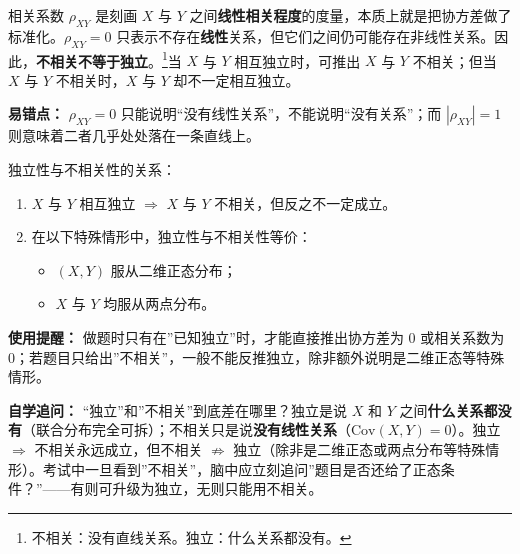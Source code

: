 ﻿\documentclass[lang=cn,11pt]{elegantbook}
\begin{document}
\begin{note}
相关系数 \(\rho_{XY}\) 是刻画 \(X\) 与 \(Y\) 之间\textbf{线性相关程度}的度量，本质上就是把协方差做了标准化。\(\rho_{XY} = 0\) 只表示不存在\textbf{线性}关系，但它们之间仍可能存在非线性关系。因此，\textbf{不相关不等于独立}。\footnote{不相关：没有直线关系。独立：什么关系都没有。}当 \(X\) 与 \(Y\) 相互独立时，可推出 \(X\) 与 \(Y\) 不相关；但当 \(X\) 与 \(Y\) 不相关时，\(X\) 与 \(Y\) 却不一定相互独立。

\textbf{易错点：} \(\rho_{XY}=0\) 只能说明“没有线性关系”，不能说明“没有关系”；而 \(|\rho_{XY}|=1\) 则意味着二者几乎处处落在一条直线上。
\end{note}

\begin{property}\label{prop:independence-uncorrelated}
独立性与不相关性的关系：
\begin{enumerate}
    \item \(X\) 与 \(Y\) 相互独立 \(\Rightarrow\) \(X\) 与 \(Y\) 不相关，但反之不一定成立。
    \item 在以下特殊情形中，独立性与不相关性等价：
    \begin{itemize}
        \item \((X,Y)\) 服从二维正态分布；
        \item \(X\) 与 \(Y\) 均服从两点分布。
    \end{itemize}
\end{enumerate}
\end{property}

\begin{note}
\textbf{使用提醒：} 做题时只有在”已知独立”时，才能直接推出协方差为 0 或相关系数为 0；若题目只给出”不相关”，一般不能反推独立，除非额外说明是二维正态等特殊情形。

\textbf{自学追问：} “独立”和”不相关”到底差在哪里？独立是说 $X$ 和 $Y$ 之间\textbf{什么关系都没有}（联合分布完全可拆）；不相关只是说\textbf{没有线性关系}（$\mathrm{Cov}(X,Y)=0$）。独立 $\Rightarrow$ 不相关永远成立，但不相关 $\nRightarrow$ 独立（除非是二维正态或两点分布等特殊情形）。考试中一旦看到”不相关”，脑中应立刻追问”题目是否还给了正态条件？”——有则可升级为独立，无则只能用不相关。
\end{note}
\end{document}
